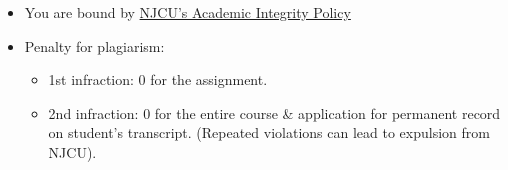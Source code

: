 \documentclass[11pt,article,oneside]{memoir}
\begin{document}
\begin{itemize} 
\item You are bound by \href{http://www.njcu.edu/uploadedFiles/About_NJCU/Governance_and_Organization/University_Senate/Policies/Academic\%20INTEGRITY\%20POLICY\%20FINAL\%202-04.pdf}{NJCU's Academic Integrity Policy}
\item Penalty for plagiarism:
\begin{itemize}
\item 1st infraction: 0 for the assignment. 
\item 2nd infraction: 0 for the entire course \& application for permanent record on student's transcript. (Repeated violations can lead to expulsion from NJCU). 
\end{itemize}
\end{itemize}
\end{document}
